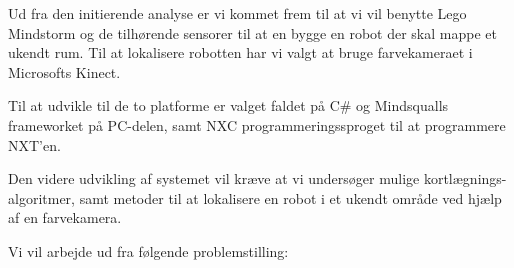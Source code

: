 
Ud fra den initierende analyse er vi kommet frem til at vi vil benytte Lego Mindstorm og de tilhørende sensorer til at en bygge en robot der skal mappe et ukendt rum.
Til at lokalisere robotten har vi valgt at bruge farvekameraet i Microsofts Kinect.

Til at udvikle til de to platforme er valget faldet på C\# og Mindsqualls frameworket på PC-delen, samt NXC programmeringssproget til at programmere NXT'en.

Den videre udvikling af systemet vil kræve at vi undersøger mulige kortlægnings-algoritmer, samt metoder til at lokalisere en robot i et ukendt område ved hjælp af en farvekamera.

Vi vil arbejde ud fra følgende problemstilling:

\begin{samepage}


\end{samepage}

